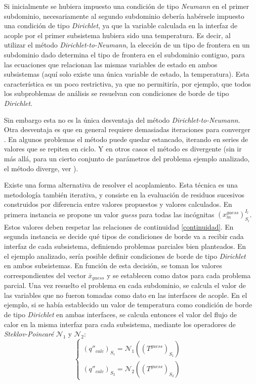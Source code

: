 Si inicialmente se hubiera impuesto una condición de tipo \textit{Neumann} en el primer subdominio, 
necesariamente al segundo subdominio debería habérsele impuesto una condición de tipo \textit{Dirichlet},
ya que la variable calculada en la interfaz de acople por el primer subsistema hubiera sido una temperatura.
Es decir, al utilizar el método \textit{Dirichlet-to-Neumann}, la elección de un tipo de frontera en un subdominio dado determina el tipo de frontera en el subdominio contiguo,
para las ecuaciones que relacionan las mismas variables de estado en ambos subsistemas (aquí solo existe una única variable de estado, la temperatura).
Esta característica es un poco restrictiva, ya que no permitiría, por ejemplo, que todos los subproblemas de análisis se resuelvan con condiciones de borde de tipo \textit{Dirichlet}.

Sin embargo esta no es la única desventaja del método \textit{Dirichlet-to-Neumann}.
Otra desventaja es que en general requiere demasiadas iteraciones para converger \cite{fede-enief2016}.
En algunos problemas el método puede quedar estancado, iterando en series de valores que se repiten en ciclo.
Y en otros casos el método es divergente (sin ir más allá, para un cierto conjunto de parámetros del problema ejemplo analizado, el método diverge, ver \cite{coup-strong}).

Existe una forma alternativa de resolver el acoplamiento.%
Esta técnica es una metodología también iterativa, y consiste en la evaluación de residuos sucesivos construidos por diferencia entre valores propuestos y valores calculados.
En primera instancia se propone un valor \textit{guess} para todas las incógnitas $(x_{m}^{guess})_{S_i}^{I_l}$.
Estos valores deben respetar las relaciones de continuidad \ref{continuidad}.
En segunda instancia se decide qué tipos de condiciones de borde va a recibir cada interfaz de cada subsistema,
definiendo problemas parciales bien planteados.
En el ejemplo analizado, sería posible definir condiciones de borde de tipo \textit{Dirichlet} en ambos subsistemas.
En función de esta decisión, se toman los valores correspondientes del vector $\bar{x}_{guess}$ y se establecen como datos para cada problema parcial.
Una vez resuelto el problema en cada subdominio, se calcula el valor de las variables que no fueron tomadas como dato en las interfaces de acople.
En el ejemplo, si se había establecido un valor de temperatura como condición de borde de tipo \textit{Dirichlet} en ambas interfaces,
se calcula entonces el valor del flujo de calor en la misma interfaz para cada subsistema, mediante los operadores de \textit{Steklov-Poincaré} $\mathscr{N}_1$ y $\mathscr{N}_2$:
\begin{equation}
\left\{\begin{matrix}
(q''_{calc})_{S_1}  = \mathscr{N}_1\left ((T^{guess})_{S_1}\right ) \\
(q''_{calc})_{S_2}  = \mathscr{N}_2\left ((T^{guess})_{S_2}\right )
\end{matrix}\right.
\label{qq_nn_tt}
\end{equation}

